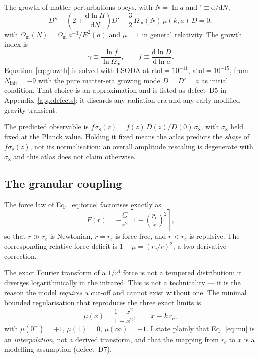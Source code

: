 \documentclass[11pt,a4paper]{article}
\theoremstyle{definition}
\newcommand{\Omm}{\Omega_{\mathrm{m}}}
\newcommand{\gamm}{\gamma}
\newcommand{\muc}{\mu(k,a)}
\begin{document}
The growth of matter perturbations obeys, with $N = \ln a$ and
$' \equiv \mathrm{d}/\mathrm{d}N$,
\begin{equation}
D'' + \left(2 + \frac{\mathrm{d}\ln H}{\mathrm{d}N}\right) D'
- \frac{3}{2}\,\Omega_{\mathrm{m}}(N)\,\muc\, D = 0,
\label{eq:growth}
\end{equation}
with $\Omega_{\mathrm{m}}(N) = \Omm\,a^{-3}/E^2(a)$ and $\mu = 1$ in general
relativity. The growth index is
\begin{equation}
\gamm \equiv \frac{\ln f}{\ln \Omega_{\mathrm{m}}},
\qquad f \equiv \frac{\mathrm{d}\ln D}{\mathrm{d}\ln a}.
\label{eq:gamma}
\end{equation}
Equation~\eqref{eq:growth} is solved with LSODA at $\mathrm{rtol} = 10^{-11}$,
$\mathrm{atol} = 10^{-15}$, from $N_{\mathrm{init}} = -9$ with the pure
matter-era growing mode $D = D' = a$ as initial condition. That choice is an
approximation and is listed as defect~D5 in Appendix~\ref{app:defects}: it
discards any radiation-era and any early modified-gravity transient.

The predicted observable is $f\sigma_8(z) = f(z)\,D(z)/D(0)\,\sigma_8$, with
$\sigma_8$ held fixed at the Planck value. Holding it fixed means the atlas
predicts the \emph{shape} of $f\sigma_8(z)$, not its normalisation: an overall
amplitude rescaling is degenerate with $\sigma_8$ and this atlas does not
claim otherwise.

\subsection{The granular coupling}

The force law of Eq.~\eqref{eq:force} factorises exactly as
\begin{equation}
F(r) = -\frac{G}{r^2}\left[1 - \left(\frac{r_c}{r}\right)^{2}\right],
\label{eq:factor}
\end{equation}
so that $r \gg r_c$ is Newtonian, $r = r_c$ is force-free, and $r < r_c$ is
repulsive. The corresponding relative force deficit is
$1 - \mu = (r_c/r)^2$, a two-derivative correction.

The exact Fourier transform of a $1/r^4$ force is not a tempered distribution:
it diverges logarithmically in the infrared. This is not a technicality --- it
is the reason the model \emph{requires} a cut-off and cannot exist without one.
The minimal bounded regularisation that reproduces the three exact limits is
\begin{equation}
\mu(x) = \frac{1 - x^2}{1 + x^2},
\qquad x \equiv k\,r_c,
\label{eq:mu}
\end{equation}
with $\mu(0^{+}) = +1$, $\mu(1) = 0$, $\mu(\infty) = -1$. I state plainly that
Eq.~\eqref{eq:mu} is an \emph{interpolation}, not a derived transform, and
that the mapping from $r_c$ to $x$ is a modelling assumption (defect~D7).
\end{document}
